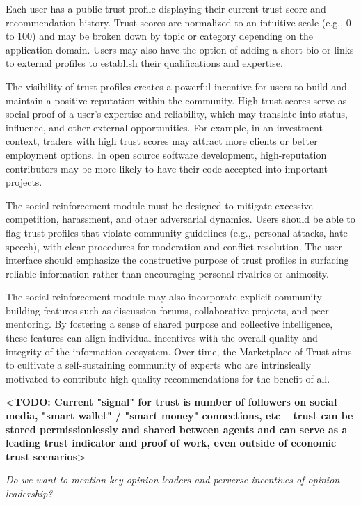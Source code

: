 \documentclass{article}
\begin{document}
Each user has a public trust profile displaying their current trust score and recommendation history. Trust scores are normalized to an intuitive scale (e.g., 0 to 100) and may be broken down by topic or category depending on the application domain. Users may also have the option of adding a short bio or links to external profiles to establish their qualifications and expertise.

The visibility of trust profiles creates a powerful incentive for users to build and maintain a positive reputation within the community. High trust scores serve as social proof of a user's expertise and reliability, which may translate into status, influence, and other external opportunities. For example, in an investment context, traders with high trust scores may attract more clients or better employment options. In open source software development, high-reputation contributors may be more likely to have their code accepted into important projects.  

The social reinforcement module must be designed to mitigate excessive competition, harassment, and other adversarial dynamics. Users should be able to flag trust profiles that violate community guidelines (e.g., personal attacks, hate speech), with clear procedures for moderation and conflict resolution. The user interface should emphasize the constructive purpose of trust profiles in surfacing reliable information rather than encouraging personal rivalries or animosity.

The social reinforcement module may also incorporate explicit community-building features such as discussion forums, collaborative projects, and peer mentoring. By fostering a sense of shared purpose and collective intelligence, these features can align individual incentives with the overall quality and integrity of the information ecosystem. Over time, the Marketplace of Trust aims to cultivate a self-sustaining community of experts who are intrinsically motivated to contribute high-quality recommendations for the benefit of all.

\textbf{<TODO: Current "signal" for trust is number of followers on social media, "smart wallet" / "smart money" connections, etc -- trust can be stored permissionlessly and shared between agents and can serve as a leading trust indicator and proof of work, even outside of economic trust scenarios>}

\textit{Do we want to mention key opinion leaders and perverse incentives of opinion leadership?}
\end{document}
